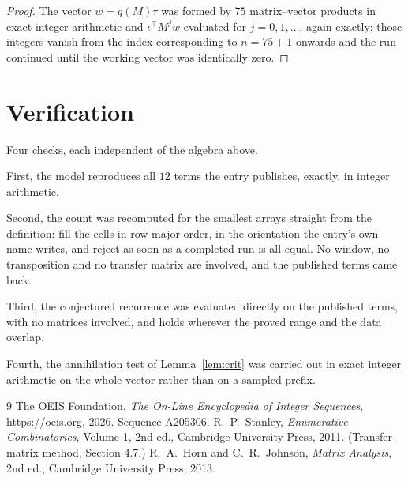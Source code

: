 \documentclass[11pt,a4paper]{article}
\theoremstyle{plain}
\theoremstyle{definition}
\begin{document}
\begin{proof}
The vector $w=q(M)\tau$ was formed by $75$ matrix--vector products in exact integer
arithmetic and $\iota^{\!\top}M^{j}w$ evaluated for $j=0,1,\dots$, again exactly; those
integers vanish from the index corresponding to $n=75+1$ onwards and the run continued
until the working vector was identically zero.
\end{proof}

\section{Verification}

Four checks, each independent of the algebra above.

First, the model reproduces all $12$ terms the entry publishes, exactly, in integer
arithmetic.

Second, the count was recomputed for the smallest arrays straight from the definition: fill the
cells in row major order, in the orientation the entry's own name writes, and reject as soon as
a completed run is all equal. No window, no transposition and no transfer matrix are involved, and
the published terms came back.

Third, the conjectured recurrence was evaluated directly on the published terms, with no
matrices involved, and holds wherever the proved range and the data overlap.

Fourth, the annihilation test of Lemma~\ref{lem:crit} was carried out in exact integer
arithmetic on the whole vector rather than on a sampled prefix.

\begin{thebibliography}{9}
 The OEIS Foundation, \emph{The On-Line Encyclopedia of Integer
Sequences}, \url{https://oeis.org}, 2026. Sequence A205306.
 R.~P.~Stanley, \emph{Enumerative Combinatorics}, Volume 1, 2nd ed.,
Cambridge University Press, 2011. (Transfer-matrix method, Section 4.7.)
 R.~A.~Horn and C.~R.~Johnson, \emph{Matrix Analysis}, 2nd ed., Cambridge
University Press, 2013.
\end{thebibliography}
\end{document}
